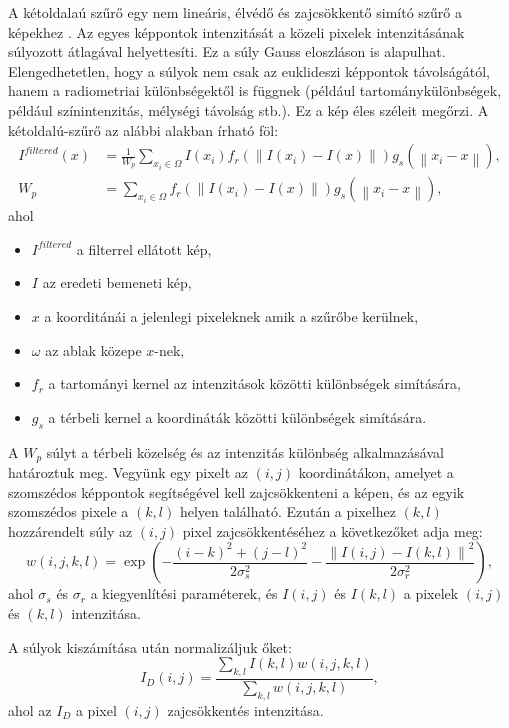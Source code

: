 
A kétoldalaú szűrő egy nem lineáris, élvédő és zajcsökkentő simító szűrő a képekhez \cite{bilateral}. Az egyes képpontok intenzitását a közeli pixelek intenzitásának súlyozott átlagával helyettesíti. Ez a súly Gauss eloszláson is  alapulhat. Elengedhetetlen, hogy a súlyok nem csak az euklideszi képpontok távolságától, hanem a radiometriai különbségektől is függnek (például tartománykülönbségek, például színintenzitás, mélységi távolság stb.). Ez a kép éles széleit megőrzi. A kétoldalú-szűrő az alábbi alakban írható föl:
\begin{align*}
I^{filtered}(x) &=
\frac{1}{W_p}\sum_{x_i\in\Omega}{I(x_i)f_r(\left \| I(x_i)-I(x) \right \|)g_s(\left \| x_i-x \right \|)}, \\
W_p &=
\sum_{x_i \in \Omega} f_r(\left \| I(x_i)-I(x) \right \|)g_s(\left \| x_i-x \right \|),
\end{align*}
ahol
\begin{itemize}
\item $I^{filtered}$ a filterrel ellátott kép,
\item $I$ az eredeti bemeneti kép,
\item $x$ a koorditánái a jelenlegi pixeleknek amik a szűrőbe kerülnek,
\item $\omega$ az ablak közepe $x$-nek,
\item $f_r$ a tartományi kernel az intenzitások közötti különbségek simítására,
\item $g_s$ a térbeli kernel a koordináták közötti különbségek simítására.
\end{itemize}
A $W_p$ súlyt a térbeli közelség és az intenzitás különbség alkalmazásával határoztuk meg. Vegyünk egy pixelt az $(i, j)$ koordinátákon, amelyet a szomszédos képpontok segítségével kell zajcsökkenteni a képen, és az egyik szomszédos pixele a $(k, l)$ helyen található. Ezután a pixelhez $(k, l)$ hozzárendelt súly az $(i, j)$ pixel zajcsökkentéséhez a következőket adja meg:
$$
w(i, j, k, l) =
\exp \left(
-\frac{(i-k)^{2}+(j-l)^{2}}{2\sigma_{s}^{2}}
-\frac{\left \| I(i,j)-I(k,l) \right \|^{2}}{2\sigma_{r}^{2}}
\right),
$$
ahol $\sigma_s$ és $\sigma_r$ a kiegyenlítési paraméterek, és $I(i, j)$ és $I(k, l)$ a pixelek $(i, j)$ és $(k, l)$ intenzitása.

A súlyok kiszámítása után normalizáljuk őket:
$$
I_{D}(i,j) =
\frac{\sum_{k,l}I(k,l)w(i, j, k, l)}{\sum_{k, l}w(i, j, k, l)},
$$
ahol az $I_D$ a pixel $(i, j)$ zajcsökkentés intenzitása.

